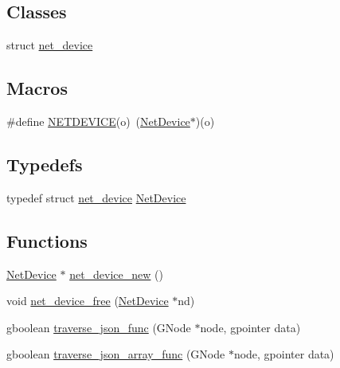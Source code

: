 \subsection*{Classes}
\begin{DoxyCompactItemize}
\item 
struct \hyperlink{structnet__device}{net\+\_\+device}
\end{DoxyCompactItemize}
\subsection*{Macros}
\begin{DoxyCompactItemize}
\item 
\#define \hyperlink{gnode-object_8h_a92eeaa07ea1bf740872e6f0fc1cf0caf}{N\+E\+T\+D\+E\+V\+I\+CE}(o)~(\hyperlink{gnode-object_8h_ab9c23d3a2ba4d9157b5ab053f61388dc}{Net\+Device}$\ast$)(o)
\end{DoxyCompactItemize}
\subsection*{Typedefs}
\begin{DoxyCompactItemize}
\item 
typedef struct \hyperlink{structnet__device}{net\+\_\+device} \hyperlink{gnode-object_8h_ab9c23d3a2ba4d9157b5ab053f61388dc}{Net\+Device}
\end{DoxyCompactItemize}
\subsection*{Functions}
\begin{DoxyCompactItemize}
\item 
\hyperlink{gnode-object_8h_ab9c23d3a2ba4d9157b5ab053f61388dc}{Net\+Device} $\ast$ \hyperlink{gnode-object_8h_ae666b3f20895e60917e691c81d464235}{net\+\_\+device\+\_\+new} ()
\item 
void \hyperlink{gnode-object_8h_af75477fcbe781bc0b17c75c1ad6d1606}{net\+\_\+device\+\_\+free} (\hyperlink{gnode-object_8h_ab9c23d3a2ba4d9157b5ab053f61388dc}{Net\+Device} $\ast$nd)
\item 
gboolean \hyperlink{gnode-object_8h_acde5d3e413f355d1b912f0dcb9d4cdc1}{traverse\+\_\+json\+\_\+func} (G\+Node $\ast$node, gpointer data)
\item 
gboolean \hyperlink{gnode-object_8h_a0d906716c0b2c59e34bff01153dc23d2}{traverse\+\_\+json\+\_\+array\+\_\+func} (G\+Node $\ast$node, gpointer data)
\end{DoxyCompactItemize}


